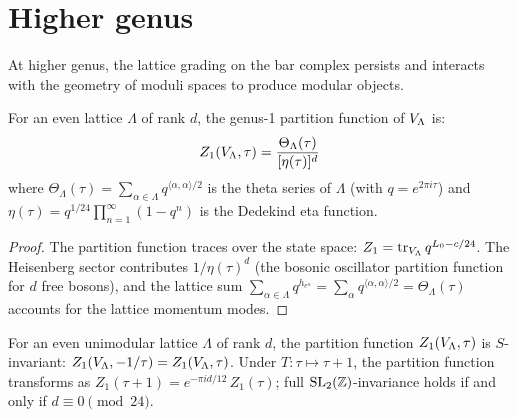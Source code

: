 \section{Higher genus}
\label{sec:lattice:higher-genus}

At higher genus, the lattice grading on the bar complex persists and
interacts with the geometry of moduli spaces to produce modular objects.

\begin{proposition}
\label{prop:lattice:genus-1}
For an even lattice $\Lambda$ of rank $d$, the genus-1 partition
function of $V_\Lambda$ is:
\begin{equation}\label{eq:lattice:genus-1-Z}
Z_1(V_\Lambda, \tau)
= \frac{\Theta_\Lambda(\tau)}{[\eta(\tau)]^d}
\end{equation}
where $\Theta_\Lambda(\tau) = \sum_{\alpha \in \Lambda}
q^{\langle\alpha,\alpha\rangle/2}$ is the theta series of $\Lambda$
(with $q = e^{2\pi i \tau}$) and $\eta(\tau) = q^{1/24}
\prod_{n=1}^\infty (1 - q^n)$ is the Dedekind eta function.
\end{proposition}

\begin{proof}
The partition function traces over the state space:
$Z_1 = \operatorname{tr}_{V_\Lambda} q^{L_0 - c/24}$.
The Heisenberg sector contributes $1/\eta(\tau)^d$ (the bosonic
oscillator partition function for $d$ free bosons), and the lattice
sum $\sum_{\alpha \in \Lambda} q^{h_{e^\alpha}}
= \sum_\alpha q^{\langle\alpha,\alpha\rangle/2} = \Theta_\Lambda(\tau)$
accounts for the lattice momentum modes.
\end{proof}

\begin{theorem}\label{thm:lattice:modular-invariance}
For an even unimodular lattice $\Lambda$ of rank $d$, the partition
function $Z_1(V_\Lambda, \tau)$ is $S$-invariant:
$Z_1(V_\Lambda, -1/\tau) = Z_1(V_\Lambda, \tau)$.
Under $T: \tau \mapsto \tau+1$, the partition function transforms as
$Z_1(\tau+1) = e^{-\pi i d/12}\, Z_1(\tau)$; full
$\mathrm{SL}_2(\mathbb{Z})$-invariance holds if and only if $d \equiv 0 \pmod{24}$.
\end{theorem}

